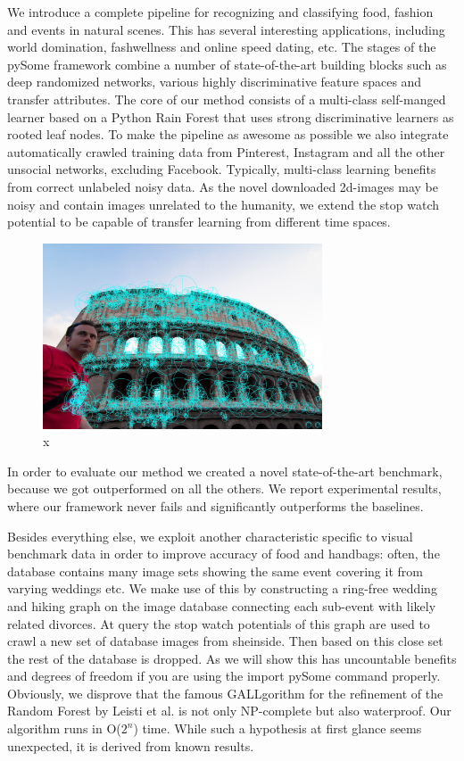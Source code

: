 \documentclass[runningheads]{llncs}
\begin{document}
We introduce a complete pipeline for recognizing and classifying food, fashion and events in natural scenes. 
This has several interesting applications, including world domination, fashwellness and online speed dating, etc. 
The stages of the pySome framework combine a number of state-of-the-art building blocks such as deep randomized networks, various highly discriminative feature spaces and transfer attributes. 
The core of our method consists of a multi-class self-manged learner based on a Python Rain Forest that uses strong discriminative learners as rooted leaf nodes. 
To make the pipeline as awesome as possible we also integrate automatically crawled training data from Pinterest, Instagram and all the other unsocial networks, excluding Facebook.
Typically, multi-class learning benefits from correct unlabeled noisy data. 
 As the novel downloaded 2d-images  may be noisy and contain images unrelated to the humanity, we extend the stop watch potential to be capable of transfer learning from different time spaces. 
  \begin{figure} \centering \includegraphics[height=5.5cm]{images/gabriele.jpg}
  \caption{x} \label{fig:label0} \end{figure}
 In order to evaluate our method we created a novel state-of-the-art benchmark, because we got outperformed on all the others.  We report experimental results, where our framework never fails and significantly outperforms the baselines.

Besides everything else, we exploit another characteristic specific to visual benchmark data in order to improve accuracy of food and handbags:
often, the database contains many image sets showing the same event covering it from varying weddings etc. 
We make use of this by constructing a ring-free wedding and hiking graph on the image database connecting each sub-event  with likely related divorces.
 At query the stop watch potentials of this graph are used to crawl a new set of database images from sheinside. 
 Then based on this close set the rest of the database is dropped. 
 As we will show this has uncountable benefits and degrees of freedom if you are using the import pySome command properly.
 Obviously, we disprove that the famous GALLgorithm for the refinement of the
 Random Forest by Leisti et al. is not only NP-complete but also waterproof. Our algorithm runs in O($2^n$) time.
 While such a hypothesis at first glance seems unexpected, it is derived
 from known results.
\end{document}

